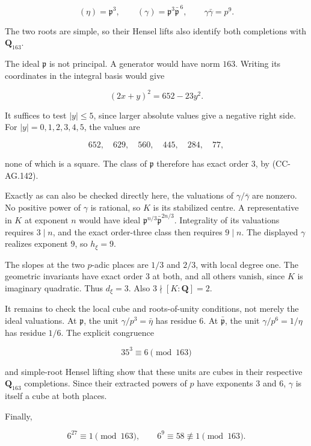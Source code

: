 \[
 (\eta)=\mathfrak p^3,
 \qquad (\gamma)=\mathfrak p^3\bar{\mathfrak p}^{\,6},
 \qquad \gamma\bar\gamma=p^9.
 \tag{CC-AG.142}
\]

The two roots are simple, so their Hensel lifts also identify both
completions with \(\mathbf Q_{163}\).

The ideal \(\mathfrak p\) is not principal. A generator would have norm
\(163\). Writing its coordinates in the integral basis would give

\[
 (2x+y)^2=652-23y^2.
\]

It suffices to test \(|y|\le5\), since larger absolute values give a
negative right side. For \(|y|=0,1,2,3,4,5\), the values are

\[
 652,\quad629,\quad560,\quad445,\quad284,\quad77,
\]

none of which is a square. The class of \(\mathfrak p\) therefore has
exact order \(3\), by (CC-AG.142).

Exactly as can also be checked directly here, the valuations of
\(\gamma/\bar\gamma\) are nonzero. No positive power of \(\gamma\) is
rational, so \(K\) is its stabilized centre. A representative in \(K\)
at exponent \(n\) would have ideal
\(\mathfrak p^{n/3}\bar{\mathfrak p}^{2n/3}\). Integrality of its
valuations requires \(3\mid n\), and the exact order-three class then
requires \(9\mid n\). The displayed \(\gamma\) realizes exponent \(9\),
so \(h_\xi=9\).

The slopes at the two \(p\)-adic places are \(1/3\) and \(2/3\), with
local degree one. The geometric invariants have exact order \(3\) at
both, and all others vanish, since \(K\) is imaginary quadratic. Thus
\(d_\xi=3\). Also \(3\nmid[K:\mathbf Q]=2\).

It remains to check the local cube and roots-of-unity conditions, not
merely the ideal valuations. At \(\mathfrak p\), the unit
\(\gamma/p^3=\bar\eta\) has residue \(6\). At \(\bar{\mathfrak p}\), the
unit \(\gamma/p^6=1/\eta\) has residue \(1/6\). The explicit congruence

\[
 35^3\equiv6\pmod{163}
 \tag{CC-AG.143}
\]

and simple-root Hensel lifting show that these units are cubes in their
respective \(\mathbf Q_{163}\) completions. Since their extracted powers
of \(p\) have exponents \(3\) and \(6\), \(\gamma\) is itself a cube at
both places.

Finally,

\[
 6^{27}\equiv1\pmod{163},\qquad
 6^9\equiv58\not\equiv1\pmod{163}.
 \tag{CC-AG.144}
\]

